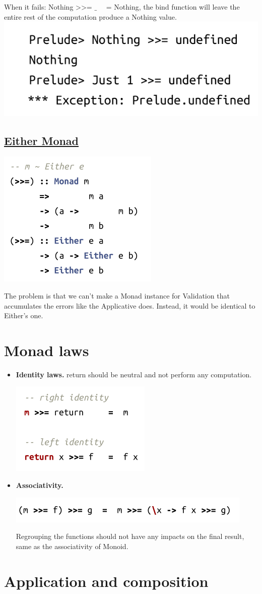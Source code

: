 \documentclass{article}
\begin{document}
When it fails: {\selectfont Nothing >>= $\_ \quad$ = Nothing}, the {\selectfont bind} function will leave the entire rest of the computation produce a {\selectfont Nothing} value.\\    
  \includegraphics[width = 6 cm]{./images/bindundefined.png} 

  \subsection*{{\selectfont \underline{Either Monad}}}
  \includegraphics[width = 4.5 cm]{./images/eithermonad.png} 
 
  The problem is that we can't make a {\selectfont Monad} instance for {\selectfont Validation} that accumulates the errors like the Applicative does. Instead, it would be identical to {\selectfont Either}'s one.

  \section{Monad laws}
\begin{itemize}
  \renewcommand\labelitemi{{\footnotesize \textcolor{blue5}{$\blacksquare$}} }
  \item \textbf{\textcolor{blue5}{\selectfont Identity laws.}} 
    {\selectfont return} should be neutral and not perform any computation.

      \includegraphics[width = 3.7 cm]{./images/identity.png} 

  \item \textbf{\textcolor{blue5}{\selectfont Associativity.}}

      \includegraphics[width = 6.3 cm]{./images/associativity.png} 

      Regrouping the functions should not have any impacts on the final result, same as the associativity of {\selectfont Monoid}.
    
\end{itemize}   

\section{Application and composition}
\end{document}
